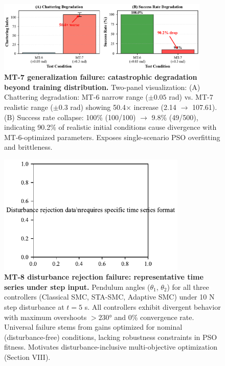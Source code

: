 \begin{figure}[htbp]
\centering
\includegraphics[width=0.9\textwidth]{figures/fig6_robustness_degradation.pdf}
\caption{%
\textbf{MT-7 generalization failure: catastrophic degradation beyond training distribution.}
Two-panel visualization: (A) Chattering degradation: MT-6 narrow range
($\pm 0.05$ rad) vs. MT-7 realistic range ($\pm 0.3$ rad) showing 50.4$\times$ increase
(2.14 $\rightarrow$ 107.61). (B) Success rate collapse: 100\% (100/100) $\rightarrow$ 9.8\% (49/500),
indicating 90.2\% of realistic initial conditions cause divergence with
MT-6-optimized parameters. Exposes single-scenario PSO overfitting and brittleness.
}
\label{fig:generalization-failure}
\end{figure}

\begin{figure}[htbp]
\centering
\includegraphics[width=0.8\textwidth]{figures/fig7_disturbance_rejection.pdf}
\caption{%
\textbf{MT-8 disturbance rejection failure: representative time series under step input.}
Pendulum angles ($\theta_1$, $\theta_2$) for all three controllers
(Classical SMC, STA-SMC, Adaptive SMC) under 10 N step disturbance at $t=5$ s.
All controllers exhibit divergent behavior with maximum overshoots $>230°$ and
0\% convergence rate. Universal failure stems from gains optimized for
nominal (disturbance-free) conditions, lacking robustness constraints in PSO fitness.
Motivates disturbance-inclusive multi-objective optimization (Section VIII).
}
\label{fig:disturbance-rejection}
\end{figure}

